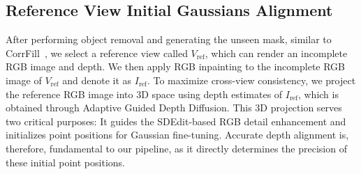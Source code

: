 \subsection{Reference View Initial Gaussians Alignment} \label{sec:depth_initial}
After performing object removal and generating the unseen mask, similar to CorrFill~\cite{liu2025corrfill}, we select a reference view called \( V_{\text{ref}} \), which can render an incomplete RGB image and depth. We then apply RGB inpainting to the incomplete RGB image of \( V_{\text{ref}} \) and denote it as $I_{\text{ref}}$. 
To maximize cross-view consistency, we project the reference RGB image into 3D space using depth estimates of $I_{\text{ref}}$, which is obtained through Adaptive Guided Depth Diffusion. This 3D projection serves two critical purposes: It guides the SDEdit-based RGB detail enhancement and initializes point positions for Gaussian fine-tuning. Accurate depth alignment is, therefore, fundamental to our pipeline, as it directly determines the precision of these initial point positions.




